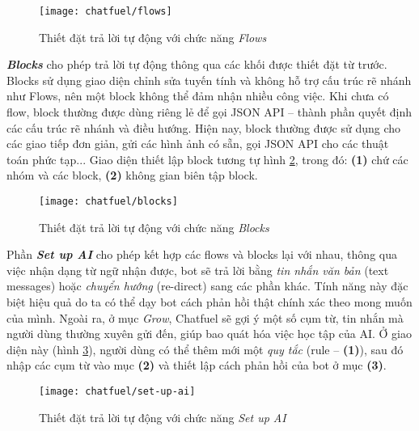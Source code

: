\begin{figure}[htb!]\centering
	\texttt{[image: chatfuel/flows]}
	\caption{Thiết đặt trả lời tự động với chức năng \textit{Flows}}
	\label{fig:fig-s3-2-chatfuel-automation-flows}
\end{figure}\par

\textbf{\textit{Blocks}} cho phép trả lời tự động thông qua các khối được thiết đặt từ trước. Blocks sử dụng giao diện chỉnh sửa tuyến tính và không hỗ trợ cấu trúc rẽ nhánh như Flows, nên một block không thể đảm nhận nhiều công việc. Khi chưa có flow, block thường được dùng riêng lẻ để gọi JSON API – thành phần quyết định các cấu trúc rẽ nhánh và điều hướng. Hiện nay, block thường được sử dụng cho các giao tiếp đơn giản, gửi các hình ảnh có sẵn, gọi JSON API cho các thuật toán phức tạp... Giao diện thiết lập block tương tự hình \ref{fig:fig-s3-2-chatfuel-automation-blocks}, trong đó: \textbf{(1)} chứ các nhóm và các block, \textbf{(2)} không gian biên tập block.\par
\begin{figure}[htb!]\centering
	\texttt{[image: chatfuel/blocks]}
	\caption{Thiết đặt trả lời tự động với chức năng \textit{Blocks}}
	\label{fig:fig-s3-2-chatfuel-automation-blocks}
\end{figure}\par

Phần \textbf{\textit{Set up AI}} cho phép kết hợp các flows và blocks lại với nhau, thông qua việc nhận dạng từ ngữ nhận được, bot sẽ trả lời bằng \textit{tin nhắn văn bản} (text messages) hoặc \textit{chuyển hướng} (re-direct) sang các phần khác. Tính năng này đặc biệt hiệu quả do ta có thể dạy bot cách phản hồi thật chính xác theo mong muốn của mình. Ngoài ra, ở mục \textit{Grow}, Chatfuel sẽ gợi ý một số cụm từ, tin nhắn mà người dùng thường xuyên gửi đến, giúp bao quát hóa việc học tập của AI. Ở giao diện này (hình \ref{fig:fig-s3-2-chatfuel-automation-ai}), người dùng có thể thêm mới một \textit{quy tắc} (rule – \textbf{(1)}), sau đó nhập các cụm từ vào mục \textbf{(2)} và thiết lập cách phản hồi của bot ở mục \textbf{(3)}.\par
\begin{figure}[htb!]\centering
	\texttt{[image: chatfuel/set-up-ai]}
	\caption{Thiết đặt trả lời tự động với chức năng \textit{Set up AI}}
	\label{fig:fig-s3-2-chatfuel-automation-ai}
\end{figure}\par

